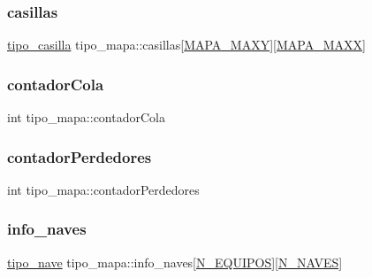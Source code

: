 \subsubsection{\texorpdfstring{casillas}{casillas}}
{\footnotesize\ttfamily \hyperlink{structtipo__casilla}{tipo\+\_\+casilla} tipo\+\_\+mapa\+::casillas\mbox{[}\hyperlink{simulador_8h_a5ae04aabcd69e10042a64a5dcf9a959d}{M\+A\+P\+A\+\_\+\+M\+A\+XY}\mbox{]}\mbox{[}\hyperlink{simulador_8h_ab55303c06ac5e3f77559983df0288e73}{M\+A\+P\+A\+\_\+\+M\+A\+XX}\mbox{]}}

\mbox{\label{structtipo__mapa_a7f9e90d387d66f389630d65851398308}} 
\subsubsection{\texorpdfstring{contador\+Cola}{contadorCola}}
{\footnotesize\ttfamily int tipo\+\_\+mapa\+::contador\+Cola}

\mbox{\label{structtipo__mapa_a6cb20251f08713a0f1c08da2216d16e1}} 
\subsubsection{\texorpdfstring{contador\+Perdedores}{contadorPerdedores}}
{\footnotesize\ttfamily int tipo\+\_\+mapa\+::contador\+Perdedores}

\mbox{\label{structtipo__mapa_a4796e19ff6b789ec44086b1bd662cd37}} 
\subsubsection{\texorpdfstring{info\+\_\+naves}{info\_naves}}
{\footnotesize\ttfamily \hyperlink{structtipo__nave}{tipo\+\_\+nave} tipo\+\_\+mapa\+::info\+\_\+naves\mbox{[}\hyperlink{simulador_8h_ab306668933fb4316ac0f5ef291d13dff}{N\+\_\+\+E\+Q\+U\+I\+P\+OS}\mbox{]}\mbox{[}\hyperlink{simulador_8h_aa1f2aba814c6d46772f9694849eeaa7a}{N\+\_\+\+N\+A\+V\+ES}\mbox{]}}

